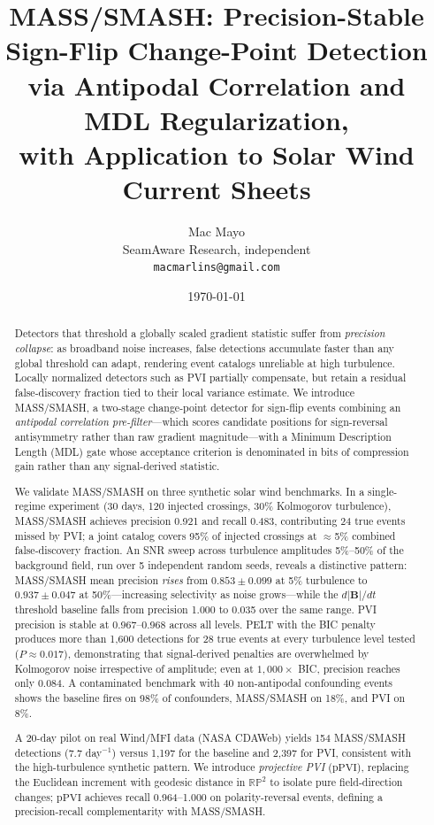 \documentclass[12pt,letterpaper]{article}
\title{\textbf{MASS/SMASH: Precision-Stable Sign-Flip Change-Point Detection \\
via Antipodal Correlation and MDL Regularization, \\
with Application to Solar Wind Current Sheets}}
\author{
  Mac Mayo\\
  \small{SeamAware Research, independent}\\
  \small{\texttt{macmarlins@gmail.com}}
}
\date{\today}
\newcommand{\pPVI}{\mathrm{pPVI}}
\begin{document}
\maketitle

\begin{abstract}
Detectors that threshold a globally scaled gradient statistic suffer from
\emph{precision collapse}: as broadband noise increases, false detections
accumulate faster than any global threshold can adapt, rendering event catalogs
unreliable at high turbulence.
Locally normalized detectors such as PVI partially compensate, but retain a
residual false-discovery fraction tied to their local variance estimate.
We introduce MASS/SMASH, a two-stage change-point detector for sign-flip
events combining an \emph{antipodal correlation pre-filter}---which scores
candidate positions for sign-reversal antisymmetry rather than raw gradient
magnitude---with a Minimum Description Length (MDL) gate whose acceptance
criterion is denominated in bits of compression gain rather than any
signal-derived statistic.

We validate MASS/SMASH on three synthetic solar wind benchmarks.
In a single-regime experiment (30 days, 120 injected crossings, 30\%
Kolmogorov turbulence), MASS/SMASH achieves precision 0.921 and recall 0.483,
contributing 24 true events missed by PVI; a joint catalog covers 95\% of
injected crossings at $\approx$5\% combined false-discovery fraction.
An SNR sweep across turbulence amplitudes 5\%--50\% of the background field,
run over 5 independent random seeds, reveals a distinctive pattern:
MASS/SMASH mean precision \emph{rises} from $0.853\pm0.099$ at 5\% turbulence
to $0.937\pm0.047$ at 50\%---increasing selectivity as noise grows---while
the $d|\mathbf{B}|/dt$ threshold baseline falls from precision 1.000 to
0.035 over the same range.
PVI precision is stable at 0.967--0.968 across all levels.
PELT \citep{Killick2012} with the BIC penalty produces more than 1{,}600
detections for 28 true events at every turbulence level tested ($P \approx
0.017$), demonstrating that signal-derived penalties are overwhelmed by
Kolmogorov noise irrespective of amplitude; even at $1{,}000\times$ BIC,
precision reaches only 0.084.
A contaminated benchmark with 40 non-antipodal confounding events shows the
baseline fires on 98\% of confounders, MASS/SMASH on 18\%, and PVI on 8\%.

A 20-day pilot on real Wind/MFI data (NASA CDAWeb) yields 154 MASS/SMASH
detections (7.7 day$^{-1}$) versus 1{,}197 for the baseline and 2{,}397 for
PVI, consistent with the high-turbulence synthetic pattern.
We introduce \emph{projective PVI} ($\pPVI$), replacing the Euclidean
increment with geodesic distance in $\mathbb{RP}^2$ to isolate pure
field-direction changes; $\pPVI$ achieves recall 0.964--1.000 on
polarity-reversal events, defining a precision-recall complementarity with
MASS/SMASH.
\end{abstract}
\end{document}
